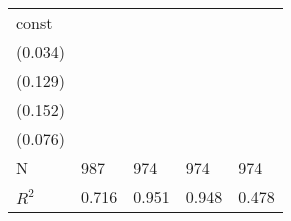 \begin{tabular}{lllll}
const                      &   \makecell{$0.126^{***}$ \\ (0.034)} &    \makecell{$-0.003^{}$ \\ (0.129)} &     \makecell{$0.025^{}$ \\ (0.152)} &    \makecell{$0.240^{***}$ \\ (0.076)} \\
\midrule N                 &                                   987 &                                  974 &                                  974 &                                    974 \\
$R^2$                      &                                 0.716 &                                0.951 &                                0.948 &                                  0.478 \\
\bottomrule
\end{tabular}
